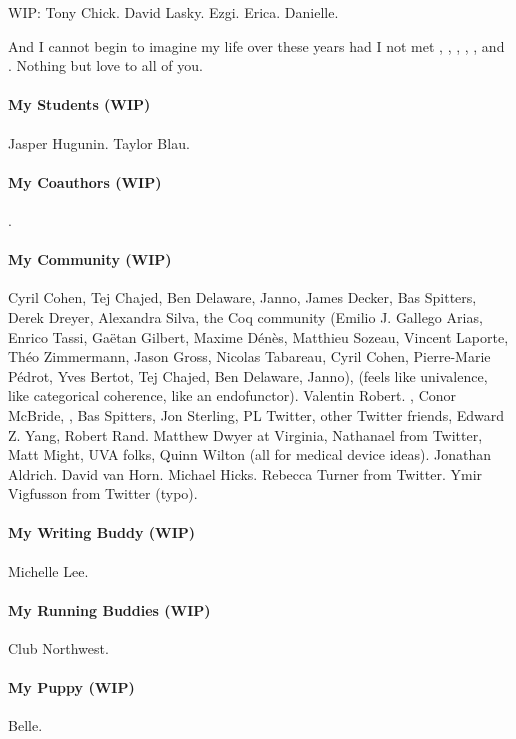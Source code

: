 \documentclass[ twoside,openright,titlepage,numbers=noenddot,headinclude,
                footinclude=true,cleardoublepage=empty,abstractoff,%
                BCOR=5mm,paper=letter,fontsize=11pt,letterpaper,%
                american,%
                ]{scrreprt}
\begin{document}
WIP: Tony Chick. David Lasky. Ezgi. Erica. Danielle.

And I cannot begin to imagine my life over these years had I not met
, , , , ,
and . %
Nothing but love to all of you.

\paragraph{My Students (WIP)}
Jasper Hugunin.
Taylor Blau.

\paragraph{My Coauthors (WIP)}
.

\paragraph{My Community (WIP)}
Cyril Cohen, Tej Chajed, Ben Delaware, Janno,
James Decker, Bas Spitters,
Derek Dreyer,
Alexandra Silva,
the Coq community (Emilio J. Gallego Arias, Enrico Tassi, Ga\"{e}tan Gilbert, Maxime D\'{e}n\`{e}s,
Matthieu Sozeau, Vincent Laporte, Th\'{e}o Zimmermann, Jason Gross, Nicolas Tabareau, Cyril Cohen, Pierre-Marie P\'{e}drot, Yves Bertot, Tej Chajed, Ben Delaware, Janno),
 (feels like univalence, like categorical coherence, like an endofunctor).
Valentin Robert.
, Conor McBride, , Bas Spitters, Jon Sterling,
PL Twitter, other Twitter friends,
Edward Z. Yang, Robert Rand.
Matthew Dwyer at Virginia, Nathanael from Twitter, Matt Might, UVA folks, Quinn Wilton (all for medical device ideas).
Jonathan Aldrich.
David van Horn.
Michael Hicks. %
Rebecca Turner from Twitter.
Ymir Vigfusson from Twitter (typo).

\paragraph{My Writing Buddy (WIP)}
Michelle Lee.

\paragraph{My Running Buddies (WIP)}
Club Northwest.

\paragraph{My Puppy (WIP)}
Belle.
\end{document}
